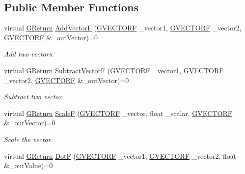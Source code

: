 \subsection*{Public Member Functions}
\begin{DoxyCompactItemize}
\item 
virtual \mbox{\hyperlink{namespace_g_w_a67a839e3df7ea8a5c5686613a7a3de21}{G\+Return}} \mbox{\hyperlink{class_g_w_1_1_m_a_t_h_1_1_g_vector_abed6b09d9bab25de229a16015899d682}{Add\+VectorF}} (\mbox{\hyperlink{struct_g_w_1_1_m_a_t_h_1_1_g_v_e_c_t_o_r_f}{G\+V\+E\+C\+T\+O\+RF}} \+\_\+vector1, \mbox{\hyperlink{struct_g_w_1_1_m_a_t_h_1_1_g_v_e_c_t_o_r_f}{G\+V\+E\+C\+T\+O\+RF}} \+\_\+vector2, \mbox{\hyperlink{struct_g_w_1_1_m_a_t_h_1_1_g_v_e_c_t_o_r_f}{G\+V\+E\+C\+T\+O\+RF}} \&\+\_\+out\+Vector)=0
\begin{DoxyCompactList}\small\item\em Add two vectors. \end{DoxyCompactList}\item 
virtual \mbox{\hyperlink{namespace_g_w_a67a839e3df7ea8a5c5686613a7a3de21}{G\+Return}} \mbox{\hyperlink{class_g_w_1_1_m_a_t_h_1_1_g_vector_af8f13c5379e21d4e569f476032d97518}{Subtract\+VectorF}} (\mbox{\hyperlink{struct_g_w_1_1_m_a_t_h_1_1_g_v_e_c_t_o_r_f}{G\+V\+E\+C\+T\+O\+RF}} \+\_\+vector1, \mbox{\hyperlink{struct_g_w_1_1_m_a_t_h_1_1_g_v_e_c_t_o_r_f}{G\+V\+E\+C\+T\+O\+RF}} \+\_\+vector2, \mbox{\hyperlink{struct_g_w_1_1_m_a_t_h_1_1_g_v_e_c_t_o_r_f}{G\+V\+E\+C\+T\+O\+RF}} \&\+\_\+out\+Vector)=0
\begin{DoxyCompactList}\small\item\em Subtract two vector. \end{DoxyCompactList}\item 
virtual \mbox{\hyperlink{namespace_g_w_a67a839e3df7ea8a5c5686613a7a3de21}{G\+Return}} \mbox{\hyperlink{class_g_w_1_1_m_a_t_h_1_1_g_vector_a91373ccef519452b52c2b820f312d494}{ScaleF}} (\mbox{\hyperlink{struct_g_w_1_1_m_a_t_h_1_1_g_v_e_c_t_o_r_f}{G\+V\+E\+C\+T\+O\+RF}} \+\_\+vector, float \+\_\+scalar, \mbox{\hyperlink{struct_g_w_1_1_m_a_t_h_1_1_g_v_e_c_t_o_r_f}{G\+V\+E\+C\+T\+O\+RF}} \&\+\_\+out\+Vector)=0
\begin{DoxyCompactList}\small\item\em Scale the vector. \end{DoxyCompactList}\item 
virtual \mbox{\hyperlink{namespace_g_w_a67a839e3df7ea8a5c5686613a7a3de21}{G\+Return}} \mbox{\hyperlink{class_g_w_1_1_m_a_t_h_1_1_g_vector_aaa041109e606595189932719588e0141}{DotF}} (\mbox{\hyperlink{struct_g_w_1_1_m_a_t_h_1_1_g_v_e_c_t_o_r_f}{G\+V\+E\+C\+T\+O\+RF}} \+\_\+vector1, \mbox{\hyperlink{struct_g_w_1_1_m_a_t_h_1_1_g_v_e_c_t_o_r_f}{G\+V\+E\+C\+T\+O\+RF}} \+\_\+vector2, float \&\+\_\+out\+Value)=0

\end{DoxyCompactItemize}
